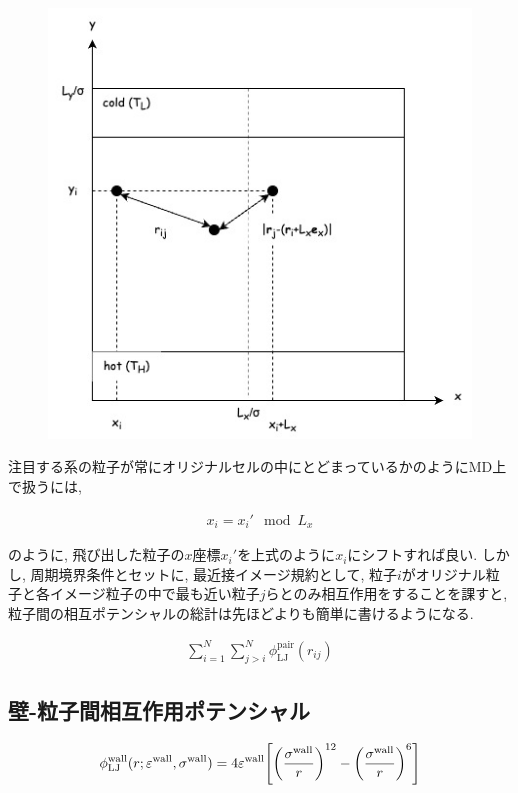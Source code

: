 \begin{figure}[H]
  \centering
  \caption{}
  \label{fig:system_periodic}
  \includegraphics[scale=0.7]{image/system_periodic.jpg}
\end{figure}

注目する系の粒子が常にオリジナルセルの中にとどまっているかのようにMD上で扱うには,

\begin{align}
  x_{i} = x_{i}' \mod L_{x} 
\end{align}

のように,  飛び出した粒子の$x$座標$x_{i}'$を上式のように$x_i$にシフトすれば良い. しかし, 周期境界条件とセットに, 最近接イメージ規約として, 粒子$i$がオリジナル粒子と各イメージ粒子の中で最も近い粒子$j$らとのみ相互作用をすることを課すと, 粒子間の相互ポテンシャルの総計は先ほどよりも簡単に書けるようになる.

\begin{align}
  \sum_{i=1}^{N} \sum_{j > i}^{N} \phi_{\text{LJ}}^{\text{pair}} (r_{ij})
\end{align}

\subsection{壁-粒子間相互作用ポテンシャル}

\begin{align}
  \phi_{\text{LJ}}^{\text{wall}}(r; \varepsilon^{\text{wall}}, \sigma^{\text{wall}}) = 4\varepsilon^{\text{wall}} \qty[\qty(\frac{\sigma^{\text{wall}}}{r})^{12} - \qty(\frac{\sigma^{\text{wall}}}{r})^{6} ] \\
\end{align}

